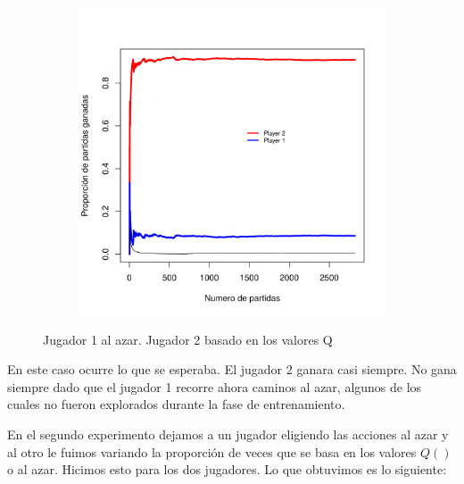 \documentclass[11pt, spanish]{article}
\begin{document}
\begin{figure}[H]
    \centering
    \begin{subfigure}[b]{0.45\textwidth}
      \includegraphics[width=\textwidth]{Imagenes/SinVision_luchaNoLibre_QsinVison_reverse}
    \end{subfigure}
    \caption{Jugador 1 al azar. Jugador 2 basado en los valores Q}
\end{figure}

\par En este caso ocurre lo que se esperaba. El jugador 2 ganara casi siempre. No gana siempre dado que el jugador 1 recorre ahora caminos al azar, algunos de los cuales no fueron explorados durante la fase de entrenamiento. 

\par En el segundo experimento dejamos a un jugador eligiendo las acciones al azar y al otro le fuimos variando la proporci\'on de veces que se basa en los valores $Q()$ o al azar. Hicimos esto para los dos jugadores. Lo que obtuvimos es lo siguiente: 
\end{document}
